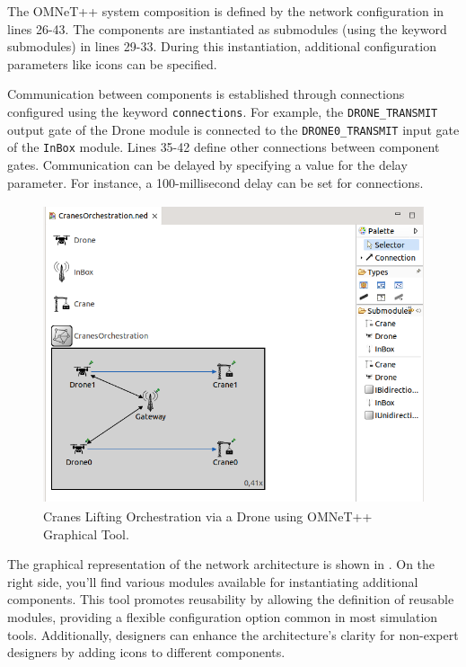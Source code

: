 The OMNeT++ system composition is defined by the network configuration in lines 26-43. The  components are instantiated as submodules (using the keyword submodules) in lines 29-33. During this instantiation, additional configuration parameters like icons can be specified.

Communication between components is established through connections configured using the keyword \texttt{connections}. For example, the \texttt{DRONE\_TRANSMIT} output gate of the Drone module is connected to the \texttt{DRONE0_TRANSMIT} input gate of the \texttt{InBox} module. Lines 35-42 define other connections between component gates. Communication can be delayed by specifying a value for the delay parameter. For instance, a 100-millisecond delay can be set for connections.

\noindent
\begin{figure}[!htbp]
    \centering
    		\includegraphics[width=350pt, height =250pt]{graphic.png}
    \caption{Cranes Lifting Orchestration via a Drone using OMNeT++ Graphical Tool. }
    \label{fig:usecase:cranes:graphic}
\end{figure} 


The graphical representation of the network architecture is shown in . On the right side, you'll find various modules available for instantiating additional components. This tool promotes reusability by allowing the definition of reusable modules, providing a flexible configuration option common in most simulation tools. Additionally, designers can enhance the architecture's clarity for non-expert designers by adding icons to different components.



